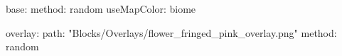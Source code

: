 base:
  method: random
  useMapColor: biome
  
overlay:
  path: "Blocks/Overlays/flower_fringed_pink_overlay.png"
  method: random